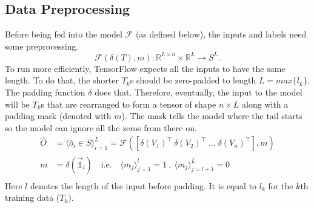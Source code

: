 \subsection{Data Preprocessing}
Before being fed into the model $\mathcal{F}$ (as defined below), the inputs and labels need some preprocessing. 
\begin{equation}\label{eq:model_F}
    \mathcal{F}(\delta(T), m) \colon \mathbb{R}^{L\times n}\times\mathbb{R}^L\to S^{L}.
\end{equation}
To run more efficiently, TensorFlow expects all the inputs to have the same length. To do that, the shorter $T_k$s should be zero-padded to length $L = max\{l_k\}$. The padding function $\delta$ does that.
Therefore, eventually, the input to the model will be $T_k$s that are rearranged to form a tensor of shape $n \times L$ along with a padding mask (denoted with $m$). 
The mask tells the model where the tail starts so the model can ignore all the zeros from there on. %
\begin{equation}\label{eq:model_as_function}
\begin{split}
    \hat{O} {}&{}= \langle \hat{o}_i \in S \rangle^L_{i=1} = \mathcal{F}\left(\left[ {\delta(V_1)}^\intercal \: {\delta(V_2)}^\intercal \; \ldots \; {\delta(V_n)}^\intercal \right],m\right) \\
    m {}&{}= \delta(\vec{\mathds{1}}_l) \quad\text{i.e.}\quad \langle {m}_j \rangle^l_{j=1} = 1\:, \: \langle {m}_j \rangle^L_{j=l+1} = 0 \\
\end{split}
\end{equation}
Here $l$ denotes the length of the input before padding. It is equal to $l_k$ for the $k$th training data ($T_k$).



